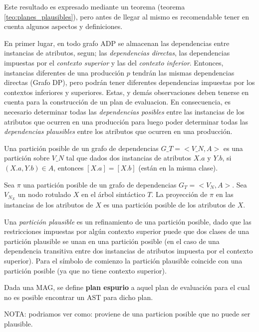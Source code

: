 Este resultado es expresado mediante un teorema (teorema \ref{teo:planes_plausibles}), pero antes de llegar al mismo es recomendable tener en cuenta algunos aspectos y definiciones.

En primer lugar, en todo grafo ADP se almacenan las dependencias entre instancias de atributos, segun; las \textit{dependencias directas}, las dependencias impuestas por el \textit{contexto superior} y las del \textit{contexto inferior}. Entonces, instancias diferentes de una producción $p$ tendrán las mismas dependencias directas (Grafo DP), pero podrán tener diferentes dependencias impuestas por los contextos inferiores y superiores. Estas, y demás observaciones deben tenerse en cuenta para la construcción de un plan de evaluacion. En consecuencia, es necesario determinar todas las \emph{dependencias posibles} entre las instancias de los atributos que ocurren en una producción para luego poder determinar todas las \emph{dependencias plausibles} entre los atributos que ocurren en una producción. 

\begin{definition} Una partición posible de un grafo de dependencias $G\_T=<V\_N,A>$ es una partición sobre $V\_N$ tal que dados dos instancias de atributos $X.a$ y $Y.b$, si $(X.a,Y.b) \in A$, entonces $[X.a] = [X.b]$ (están en la misma clase).
\end{definition}

\begin{definition} Sea $\pi$ una partición posible de un grafo de dependencias $G_T=<V_N,A>$. Sea $V_{N_X}$ un nodo rotulado $X$ en el árbol sintáctico $T$. La proyección de $\pi$ en las instancias de los atributos de $X$ es una partición posible de los atributos de $X$.
\end{definition}

Una \textit{partición plausible} es un refinamiento de una partición posible, dado que las restricciones impuestas por algún contexto superior puede que dos clases de una partición plausible se unan en una partición posible (en el caso de una dependencia transitiva entre dos instancias de atributos impuesta por el contexto superior). Para el símbolo de comienzo la partición plausible coincide con una partición posible (ya que no tiene contexto superior). \\


\begin{definition}
\label{def:plan_espurios}
Dada una MAG, se define \textbf{plan espurio} a aquel plan de evaluación para el cual no es posible encontrar un AST para dicho plan.

NOTA: podriamos ver como: proviene de una particion posible que no puede ser plausible.
\end{definition}

